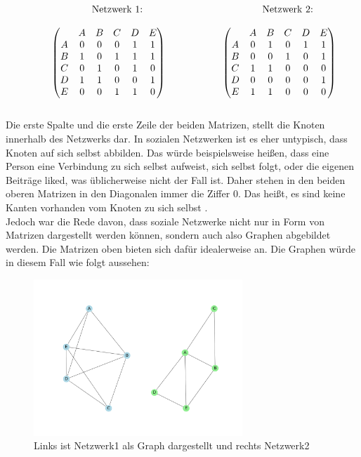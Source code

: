 \[
    \begin{array}{ccc} 
        \text{\hspace{-5.5cm}Netzwerk 1:} & \text{\hspace{-3cm}Netzwerk 2:} \\[\normalbaselineskip]
\begin{pmatrix}
& A & B & C & D & E\\
A & 0 & 0 & 0 & 1 & 1 \\
B & 1 & 0 & 1 & 1 & 1 \\
C & 0 & 1 & 0 & 1 & 0 \\
D & 1 & 1 & 0 & 0 & 1 \\
E & 0 & 0 & 1 & 1 & 0 \\
\end{pmatrix}
\hspace{2cm}
\begin{pmatrix}
& A & B & C & D & E\\
A & 0 & 1 & 0 & 1 & 1 \\
B & 0 & 0 & 1 & 0 & 1 \\
C & 1 & 1 & 0 & 0 & 0 \\
D & 0 & 0 & 0 & 0 & 1 \\
E & 1 & 1 & 0 & 0 & 0 \\
\end{pmatrix}
 \end{array} 
\]
\\
Die erste Spalte und die erste Zeile der beiden Matrizen, stellt die Knoten innerhalb des Netzwerks dar. In sozialen Netzwerken ist es eher untypisch, dass Knoten auf sich selbst abbilden. Das würde beispielsweise heißen, dass eine Person eine Verbindung zu sich selbst aufweist, sich selbst folgt, oder die eigenen Beiträge liked, was üblicherweise nicht der Fall ist. Daher stehen in den beiden oberen Matrizen in den Diagonalen immer die Ziffer $0$. Das heißt, es sind keine Kanten vorhanden vom Knoten zu sich selbst \cite{wasserman1994social}.\\
Jedoch war die Rede davon, dass soziale Netzwerke nicht nur in Form von Matrizen dargestellt werden können, sondern auch also Graphen abgebildet werden.
Die Matrizen oben bieten sich dafür idealerweise an. 
Die Graphen würde in diesem Fall wie folgt aussehen: 
\begin{figure}[h!]
    \centering
    \hspace*{-4cm}
    \includegraphics[width=0.7\textwidth]{Graphics/MatrixInNetwork.png}
    \caption{Links ist Netzwerk1 als Graph dargestellt und rechts Netzwerk2}\label{fig:MatrixInNetzwerk}
\end{figure}

